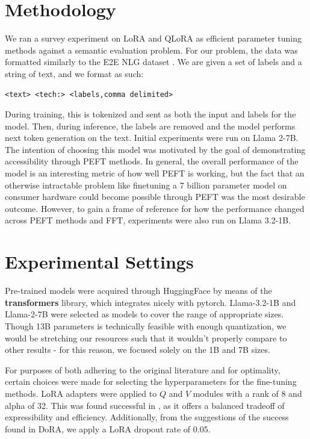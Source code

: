 \documentclass[11pt]{article}
\begin{document}
\section{Methodology}

We ran a survey experiment on LoRA and QLoRA as efficient parameter tuning methods against a semantic evaluation problem. For our problem, the data was formatted similarly to the E2E NLG dataset \cite{novikova2017e2e}. We are given a set of labels and a string of text, and we format as such:
\begin{verbatim}
<text> <tech:> <labels,comma delimited>
\end{verbatim}

During training, this is tokenized and sent as both the input and labels for the model. Then, during inference, the labels are removed and the model performs next token generation on the text. Initial experiments were run on Llama 2-7B. The intention of choosing this model was motivated by the goal of demonstrating accessibility through PEFT methods. In general, the overall performance of the model is an interesting metric of how well PEFT is working, but the fact that an otherwise intractable problem like finetuning a 7 billion parameter model on consumer hardware could become possible through PEFT was the most desirable outcome. However, to gain a frame of reference for how the performance changed across PEFT methods and FFT, experiments were also run on Llama 3.2-1B.


\section{Experimental Settings}

Pre-trained models were acquired through HuggingFace by means of the \textbf{transformers} library, which integrates nicely with pytorch. Llama-3.2-1B and Llama-2-7B were selected as models to cover the range of appropriate sizes. Though 13B parameters is technically feasible with enough quantization, we would be stretching our resources such that it wouldn't properly compare to other results - for this reason, we focused solely on the 1B and 7B sizes.

For purposes of both adhering to the original literature and for optimality, certain choices were made for selecting the hyperparameters for the fine-tuning methods. LoRA adapters were applied to $Q$ and $V$ modules with a rank of 8 and alpha of 32. This was found successful in \cite{hu2021lora}, as it offers a balanced tradeoff of expressibility and efficiency. Additionally, from the suggestions of the success found in DoRA, we apply a LoRA dropout rate of 0.05\cite{liu2024dora}.
\end{document}
